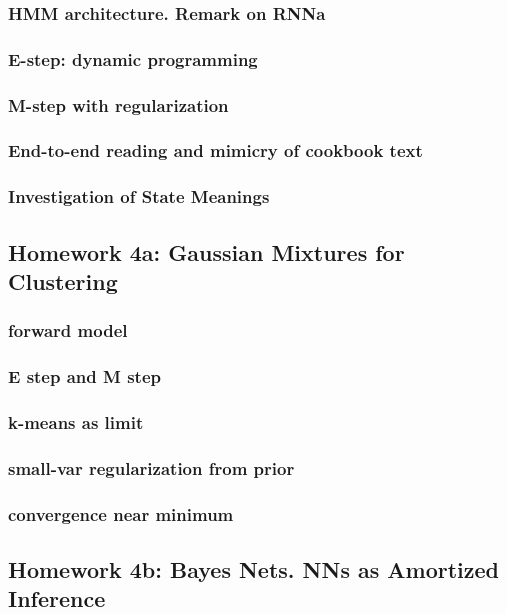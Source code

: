 \documentclass[12pt]{article}
\begin{document}
      \subsubsection*{HMM architecture.  Remark on RNNa}
      \subsubsection*{E-step: dynamic programming}
      \subsubsection*{M-step with regularization}
      \subsubsection*{End-to-end reading and mimicry of cookbook text}
      \subsubsection*{Investigation of State Meanings}
    \newpage

    \subsection*{Homework 4a: Gaussian Mixtures for Clustering} %
      \subsubsection*{forward model}
      \subsubsection*{E step and M step}
      \subsubsection*{k-means as limit}
      \subsubsection*{small-var regularization from prior}
      \subsubsection*{convergence near minimum}
    \newpage

    \subsection*{Homework 4b: Bayes Nets.  NNs as Amortized Inference}
\end{document}
